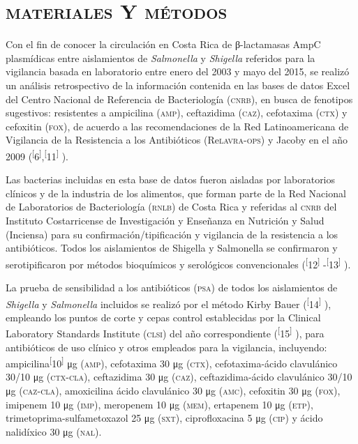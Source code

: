 \documentclass{article}
\begin{document}
\section{\textsc{materiales} Y \textsc{métodos}}

Con el fin de conocer la circulación en Costa Rica de β-lactamasas AmpC
plasmídicas entre aislamientos de \textit{Salmonella}
y \textit{Shigella}
referidos para la vigilancia basada en laboratorio entre enero del 2003 y mayo
del 2015, se realizó un análisis retrospectivo de la información contenida en
las bases de datos Excel del Centro Nacional de Referencia de Bacteriología
(\textsc{cnrb}), en busca de fenotipos sugestivos: resistentes a ampicilina (\textsc{amp}),
ceftazidima (\textsc{caz}), cefotaxima (\textsc{ctx}) y cefoxitin (\textsc{fox}), de acuerdo a las
recomendaciones de la Red Latinoamericana de Vigilancia de la Resistencia a los
Antibióticos (Re\textsc{lavra}-\textsc{ops}) y Jacoby en el año 2009
(\textsuperscript{[}6\textsuperscript{]},\textsuperscript{[}11\textsuperscript{]}
).

Las bacterias incluidas en esta base de datos fueron aisladas por laboratorios
clínicos y de la industria de los alimentos, que forman parte de la Red Nacional
de Laboratorios de Bacteriología (\textsc{rnlb}) de Costa Rica y referidas al \textsc{cnrb} del
Instituto Costarricense de Investigación y Enseñanza en Nutrición y Salud
(Inciensa) para su confirmación/tipificación y vigilancia de la resistencia a
los antibióticos. Todos los aislamientos de Shigella y Salmonella se confirmaron
y serotipificaron por métodos bioquímicos y serológicos convencionales
(\textsuperscript{[}12\textsuperscript{]}
-\textsuperscript{[}13\textsuperscript{]}
).

La prueba de sensibilidad a los antibióticos (\textsc{psa}) de todos los aislamientos de
\textit{Shigella}
y \textit{Salmonella}
incluidos se realizó por el método Kirby Bauer
(\textsuperscript{[}14\textsuperscript{]}
), empleando los puntos de corte y cepas control establecidas por la Clinical
Laboratory Standards Institute (\textsc{clsi}) del año correspondiente
(\textsuperscript{[}15\textsuperscript{]}
), para antibióticos de uso clínico y otros empleados para la vigilancia,
incluyendo: ampicilina\textsuperscript{[}10\textsuperscript{]}
μg (\textsc{amp}), cefotaxima 30 μg (\textsc{ctx}), cefotaxima-ácido clavulánico 30/10 μg
(\textsc{ctx}-\textsc{cla}), ceftazidima 30 μg (\textsc{caz}), ceftazidima-ácido clavulánico 30/10 μg
(\textsc{caz}-\textsc{cla}), amoxicilina ácido clavulánico 30 μg (\textsc{amc}), cefoxitin 30 μg (\textsc{fox}),
imipenem 10 μg (\textsc{imp}), meropenem 10 μg (\textsc{mem}), ertapenem 10 μg (\textsc{etp}),
trimetoprima-sulfametoxazol 25 μg (\textsc{sxt}), ciprofloxacina 5 μg (\textsc{cip}) y ácido
nalidíxico 30 μg (\textsc{nal}).
\end{document}
